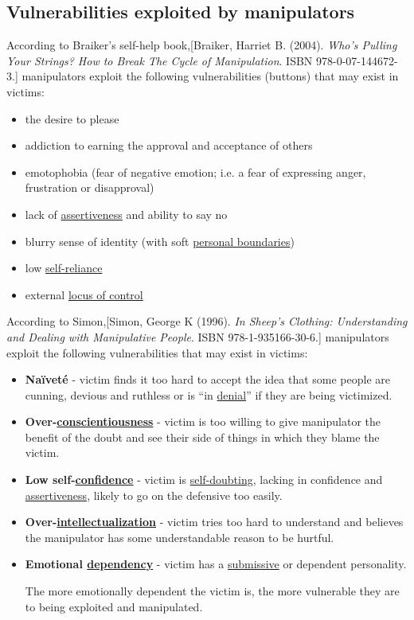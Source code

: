 \documentclass{book}
\numberwithin{equation}{section}
\begin{document}
\subsection{Vulnerabilities exploited by manipulators}
According to Braiker's self-help book,[Braiker, Harriet B. (2004). \textit{Who's Pulling Your Strings? How to Break The Cycle of Manipulation}. ISBN 978-0-07-144672-3.] manipulators exploit the following vulnerabilities (buttons) that may exist in victims:
\begin{itemize}
    \item the desire to please
    \item addiction to earning the approval and acceptance of others
    \item emotophobia (fear of negative emotion; i.e. a fear of expressing anger, frustration or disapproval)
    \item lack of \href{https://en.wikipedia.org/wiki/Assertiveness}{assertiveness} and ability to say no
    \item blurry sense of identity (with soft \href{https://en.wikipedia.org/wiki/Personal_boundaries}{personal boundaries})
    \item low \href{https://en.wikipedia.org/wiki/Self-sufficiency}{self-reliance}
    \item external \href{https://en.wikipedia.org/wiki/Locus_of_control}{locus of control}
\end{itemize}
According to Simon,[Simon, George K (1996). \textit{In Sheep's Clothing: Understanding and Dealing with Manipulative People}. ISBN 978-1-935166-30-6.] manipulators exploit the following vulnerabilities that may exist in victims: 
\begin{itemize}
    \item \textbf{Naïveté} - victim finds it too hard to accept the idea that some people are cunning, devious and ruthless or is ``in \href{https://en.wikipedia.org/wiki/Denial}{denial}'' if they are being victimized.
    \item \textbf{Over-\href{https://en.wikipedia.org/wiki/Conscientiousness}{conscientiousness}} - victim is too willing to give manipulator the benefit of the doubt and see their side of things in which they blame the victim.
    \item \textbf{Low self-\href{https://en.wikipedia.org/wiki/Confidence}{confidence}} - victim is \href{https://en.wikipedia.org/wiki/Doubt}{self-doubting}, lacking in confidence and \href{https://en.wikipedia.org/wiki/Assertiveness}{assertiveness}, likely to go on the defensive too easily.
    \item \textbf{Over-\href{https://en.wikipedia.org/wiki/Intellectualization}{intellectualization}} - victim tries too hard to understand and believes the manipulator has some understandable reason to be hurtful.
    \item \textbf{Emotional \href{https://en.wikipedia.org/wiki/Codependent}{dependency}} - victim has a \href{https://en.wikipedia.org/wiki/Submissive}{submissive} or dependent personality.
    
    The more emotionally dependent the victim is, the more vulnerable they are to being exploited and manipulated.
\end{itemize}
\end{document}
